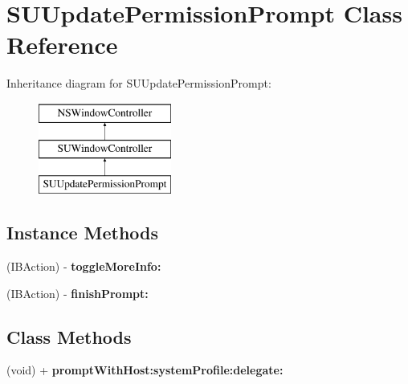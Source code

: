 \hypertarget{interface_s_u_update_permission_prompt}{}\section{S\+U\+Update\+Permission\+Prompt Class Reference}
\label{interface_s_u_update_permission_prompt}
Inheritance diagram for S\+U\+Update\+Permission\+Prompt\+:\begin{figure}[H]
\begin{center}
\leavevmode
\includegraphics[height=3.000000cm]{interface_s_u_update_permission_prompt}
\end{center}
\end{figure}
\subsection*{Instance Methods}
\begin{DoxyCompactItemize}
\item 
\mbox{\label{interface_s_u_update_permission_prompt_a8ee0f46b9625bdd87dadf419a0b1b2e2}} 
(I\+B\+Action) -\/ {\bfseries toggle\+More\+Info\+:}
\item 
\mbox{\label{interface_s_u_update_permission_prompt_a5456aafa709fc006823f015e836a0cd5}} 
(I\+B\+Action) -\/ {\bfseries finish\+Prompt\+:}
\end{DoxyCompactItemize}
\subsection*{Class Methods}
\begin{DoxyCompactItemize}
\item 
\mbox{\label{interface_s_u_update_permission_prompt_aba1ee447579edcf4798a48be5b025d4d}} 
(void) + {\bfseries prompt\+With\+Host\+:system\+Profile\+:delegate\+:}
\end{DoxyCompactItemize}
